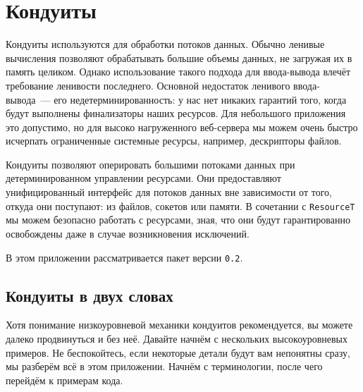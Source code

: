 \chapter{Кондуиты}\label{chap:conduit}

Кондуиты используются для обработки потоков данных. Обычно ленивые вычисления
позволяют обрабатывать большие объемы данных, не загружая их в память целиком. Однако 
использование такого подхода для ввода-вывода влечёт требование ленивости последнего.
Основной недостаток ленивого ввода-вывода~--- его недетерминированность: у нас нет никаких гарантий того, когда будут выполнены 
финализаторы наших ресурсов. Для небольшого приложения это допустимо, но
для высоко нагруженного веб-сервера мы можем очень быстро исчерпать ограниченные системные ресурсы,
например, дескрипторы файлов.

Кондуиты позволяют оперировать большими потоками данных при детерминированном управлении
ресурсами. Они предоставляют унифицированный интерфейс для потоков данных вне зависимости
от того, откуда они поступают: из файлов, сокетов или памяти. В сочетании с \lstinline{ResourceT} мы
можем безопасно работать с ресурсами, зная, что они будут гарантированно освобождены даже
в случае возникновения исключений.

В этом приложении рассматривается пакет 
 версии \verb=0.2=.

\section{Кондуиты в двух словах}
Хотя понимание низкоуровневой механики кондуитов рекомендуется, вы можете далеко
продвинуться и без неё. Давайте начнём  с нескольких  высокоуровневых 	 примеров.  Не
беспокойтесь, если некоторые детали будут вам непонятны сразу, 
  мы разберём всё в этом приложении. Начнём с терминологии, после чего перейдём к 
примерам кода.

